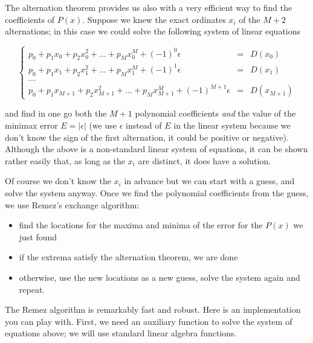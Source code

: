 \documentclass[11pt]{article}
\providecommand{\tightlist}{%
      \setlength{\itemsep}{0pt}\setlength{\parskip}{0pt}}
\begin{document}
The alternation theorem provides us also with a very efficient way to
find the coefficients of \(P(x)\). Suppose we knew the exact ordinates
\(x_i\) of the \(M+2\) alternations; in this case we could solve the
following system of linear equations

\[
    \left\{\begin{array}{lcl}
        p_0 + p_1 x_0 + p_2 x_0^2 + \ldots + p_Mx_0^M + (-1)^0\epsilon &=& D(x_0) \\ 
        p_0 + p_1 x_1 + p_2 x_1^2 + \ldots + p_Mx_1^M + (-1)^1\epsilon &=& D(x_1) \\ 
        \ldots \\ 
        p_0 + p_1 x_{M+1} + p_2 x_{M+1}^2 + \ldots + p_Mx_{M+1}^M + (-1)^{M+1}\epsilon &=& D(x_{M+1}) 
      \end{array}\right.
\]

and find in one go both the \(M+1\) polynomial coefficients \emph{and}
the value of the minimax error \(E=|\epsilon|\) (we use \(\epsilon\)
instead of \(E\) in the linear system because we don't know the sign of
the first alternation, it could be positive or negative). Although the
above is a non-standard linear system of equations, it can be shown
rather easily that, as long as the \(x_i\) are distinct, it does have a
solution.

Of course we don't know the \(x_i\) in advance but we can start with a
guess, and solve the system anyway. Once we find the polynomial
coefficients from the guess, we use Remez's exchange algorithm:

\begin{itemize}
\tightlist
\item
  find the locations for the maxima and minima of the error for the
  \(P(x)\) we just found
\item
  if the extrema satisfy the alternation theorem, we are done
\item
  otherwise, use the new locations as a new guess, solve the system
  again and repeat.
\end{itemize}

    The Remez algorithm is remarkably fast and robust. Here is an
implementation you can play with. First, we need an auxiliary function
to solve the system of equations above; we will use standard linear
algebra functions.
\end{document}
